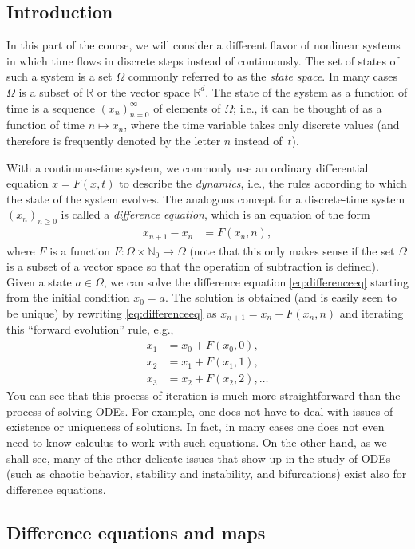 \documentclass[12pt]{amsart}
\newcommand{\eq}[1]{\begin{equation}\begin{split}#1\end{split}\end{equation}}
\newcommand{\eqst}[1]{\begin{align*}#1\end{align*}}
\newcounter{example}
\begin{document}
\subsection{Introduction} \label{sec:ergodic-intro} In this part of the course, we will consider a different flavor of nonlinear systems in which time flows in discrete steps instead of continuously. The set of states of such a system is a set $\Omega$ commonly referred to as the \emph{state space}. In many cases $\Omega$ is a subset of $\mathbb{R}$ or the vector space $\mathbb{R}^d$. The state of the system as a function of time is a sequence $(x_n)_{n=0}^\infty$ of elements of $\Omega$; i.e., it can be thought of as a function of time $n\mapsto x_n$, where the time variable takes only discrete values (and therefore is frequently denoted by the letter $n$ instead of~$t$).

With a continuous-time system, we commonly use an ordinary differential equation $\dot{x}=F(x,t)$ to describe the \emph{dynamics}, i.e., the rules according to which the state of the system evolves. The analogous concept for a discrete-time system $(x_n)_{n\ge 0}$ is called a \emph{difference equation}, which is an equation of the form
\eq{ \label{eq:differenceeq}
  x_{n+1}-x_n &= F(x_n, n),
}
where $F$ is a function $F:\Omega\times \mathbb{N}_0\to\Omega$ (note that this only makes sense if the set $\Omega$ is a subset of a vector space so that the operation of subtraction is defined). Given a state $a \in \Omega$, we can solve the difference equation \eqref{eq:differenceeq} starting from the initial condition $x_0=a$. The solution is obtained (and is easily seen to be unique) by rewriting \eqref{eq:differenceeq} as $x_{n+1}=x_n+F(x_n,n)$ and iterating this ``forward evolution'' rule, e.g.,
\eqst{
x_1 &= x_0 + F(x_0,0), \\ x_2&= x_1+F(x_1,1), \\ x_3&=x_2+F(x_2,2), \ldots 
}
You can see that this process of iteration is much more straightforward than the process of solving ODEs. For example, one does not have to deal with issues of existence or uniqueness of solutions. In fact, in many cases one does not even need to know calculus to work with such equations. On the other hand, as we shall see, many of the other delicate issues that show up in the study of ODEs (such as chaotic behavior, stability and instability, and bifurcations) exist also for difference equations.

\subsection{Difference equations and maps}
\end{document}
